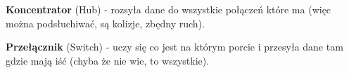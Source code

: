 \documentclass[../main.tex]{subfiles}
\begin{document}
    \textbf{Koncentrator} (Hub) - rozsyła dane do wszystkie połączeń które ma (więc można podsłuchiwać, są kolizje, zbędny ruch).

    \textbf{Przełącznik} (Switch) - uczy się co jest na którym porcie i przesyła dane tam gdzie mają iść (chyba że nie wie, to wszystkie).
\end{document}
